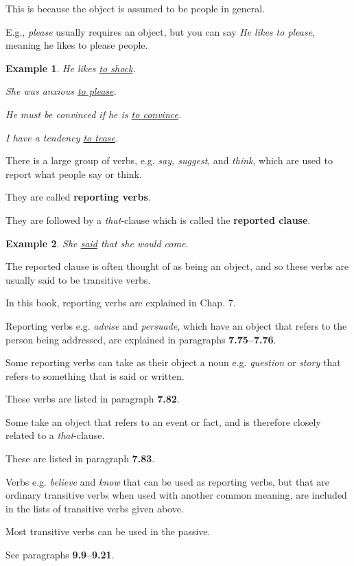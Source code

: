 \documentclass[oneside]{book}
\numberwithin{equation}{section}
\newtheorem{example}{Example}[section]
\begin{document}
This is because the object is assumed to be people in general.

E.g., \textit{please} usually requires an object, but you can say \textit{He likes to please}, meaning he likes to please people.
\begin{example}
    He likes \underline{to shock}.
    
    She was anxious \underline{to please}.
    
    He must be convinced if he is \underline{to convince}.
    
    I have a tendency \underline{to tease}.
\end{example}
%
\noindent{} There is a large group of verbs, e.g. \textit{say, suggest}, and \textit{think}, which are used to report what people say or think.

They are called \textbf{reporting verbs}.

They are followed by a \textit{that}-clause which is called the \textbf{reported clause}.
\begin{example}
    She \underline{said} that she would come.
\end{example}
The reported clause is often thought of as being an object, and so these verbs are usually said to be transitive verbs.

In this book, reporting verbs are explained in Chap. 7.

%
Reporting verbs e.g. \textit{advise} and \textit{persuade}, which have an object that refers to the person being addressed, are explained in paragraphs \textbf{7.75--7.76}.

%
Some reporting verbs can take as their object a noun e.g. \textit{question} or \textit{story} that refers to something that is said or written.

These verbs are listed in paragraph \textbf{7.82}.

Some take an object that refers to an event or fact, and is therefore closely related to a \textit{that}-clause.

These are listed in paragraph \textbf{7.83}.

%
Verbs e.g. \textit{believe} and \textit{know} that can be used as reporting verbs, but that are ordinary transitive verbs when used with another common meaning, are included in the lists of transitive verbs given above.

%
\noindent{} Most transitive verbs can be used in the passive.

See paragraphs \textbf{9.9--9.21}.
\end{document}
